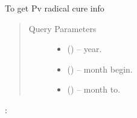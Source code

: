 \documentclass[letterpaper,10pt,english,openany,oneside]{sphinxmanual}
\begin{document}
\begin{fulllineitems}
\label{\detokenize{api-cmi/v1:get--api-malaria-info-v1-Surveillance-pv_radicalcure}}
\sphinxAtStartPar
To get Pv radical cure info
\begin{quote}\begin{description}
\item[{Query Parameters}] \leavevmode\begin{itemize}
\item {} 
\sphinxAtStartPar
{} () – year.

\item {} 
\sphinxAtStartPar
{} () – month begin.

\item {} 
\sphinxAtStartPar
{} () – month to.

\end{itemize}

\end{description}\end{quote}

\sphinxAtStartPar
{}:

\begin{sphinxVerbatim}[commandchars=\\\{\}]
   
   
   \PYG{p}{[}
           
           
           
           
  \PYG{p}{]}
\end{sphinxVerbatim}

\end{fulllineitems}
\end{document}
